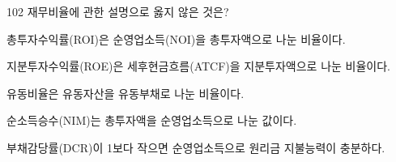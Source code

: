 \begin{question}{102}
재무비율에 관한 설명으로 옳지 않은 것은?
\begin{choices}
  \item 총투자수익률(ROI)은 순영업소득(NOI)을 총투자액으로 나눈 비율이다.
  \item 지분투자수익률(ROE)은 세후현금흐름(ATCF)을 지분투자액으로 나눈 비율이다.
  \item 유동비율은 유동자산을 유동부채로 나눈 비율이다.
  \item 순소득승수(NIM)는 총투자액을 순영업소득으로 나눈 값이다.
  \item 부채감당률(DCR)이 1보다 작으면 순영업소득으로 원리금 지불능력이 충분하다.
\end{choices}
\end{question}
